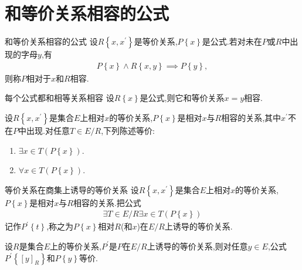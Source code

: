 \section{和等价关系相容的公式}

\begin{definition}{和等价关系相容的公式}{}
	设$R\left\{x,x^{\prime}\right\}$是等价关系,$P\left\{x\right\}$是公式.若对未在$P$或$R$中出现的字母$y$,有
	\begin{align*}
		P\left\{x\right\}\wedge R\left\{x,y\right\}\implies P\left\{y\right\},
	\end{align*}
	则称$P$相对于$x$和$R$相容.
\end{definition}

\begin{proposition}{每个公式都和相等关系相容}{}
	设$R\left\{x\right\}$是公式,则它和等价关系$x=y$相容.
\end{proposition}

\begin{metatheorem}{}{}
	设$R\left\{x,x^{\prime}\right\}$是集合$E$上相对$x$的等价关系,$P\left\{x\right\}$是相对$x$与$R$相容的关系,其中$x^{\prime}$不在$P$中出现.对任意$T\in E/R$,下列陈述等价:
	\begin{enumerate}
		\item $\exists x\in T\left(P\left\{x\right\}\right)$.
		\item $\forall x\in T\left(P\left\{x\right\}\right)$.
	\end{enumerate}
\end{metatheorem}

\begin{definition}{等价关系在商集上诱导的等价关系}{}
	设$R\left\{x,x^{\prime}\right\}$是集合$E$上相对$x$的等价关系,$P\left\{x\right\}$是相对$x$与$R$相容的关系.把公式
	\begin{align*}
		\exists T\in E/R\exists x\in T\left(P\left\{x\right\}\right)
	\end{align*}
	记作$P^{\prime}\left\{t\right\}$,称之为$P\left\{x\right\}$相对$R$(和$x$)在$E/R$上诱导的等价关系.
\end{definition}

\begin{proposition}{}{}
	设$R$是集合$E$上的等价关系,$P^{\prime}$是$P$在$E/R$上诱导的等价关系,则对任意$y\in E$,公式$P^{\prime}\left\{\left[y\right]_{R}\right\}$和$P\left\{y\right\}$等价.
\end{proposition}







































